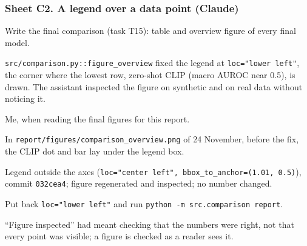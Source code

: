 \subsubsection*{Sheet C2. A legend over a data point (Claude)}
\begin{description}[style=nextline,leftmargin=1.2em]
  \item[Prompt] Write the final comparison (task T15): table and overview figure of every final model.
  \item[Faulty response] \texttt{src/comparison.py::figure\_overview} fixed the legend at
        \texttt{loc="lower left"}, the corner where the lowest row, zero-shot CLIP (macro AUROC near 0.5),
        is drawn. The assistant inspected the figure on synthetic and on real data without noticing it.
  \item[Detected by] Me, when reading the final figures for this report.
  \item[Proof] In \texttt{report/figures/comparison\_overview.png} of 24 November, before the fix, the CLIP
        dot and bar lay under the legend box.
  \item[Correction] Legend outside the axes (\texttt{loc="center left", bbox\_to\_anchor=(1.01, 0.5)}),
        commit \texttt{032cea4}; figure regenerated and inspected; no number changed.
  \item[Reproduction] Put back \texttt{loc="lower left"} and run \texttt{python -m src.comparison report}.
  \item[Reflection] ``Figure inspected'' had meant checking that the numbers were right, not that every
        point was visible; a figure is checked as a reader sees it.
\end{description}

